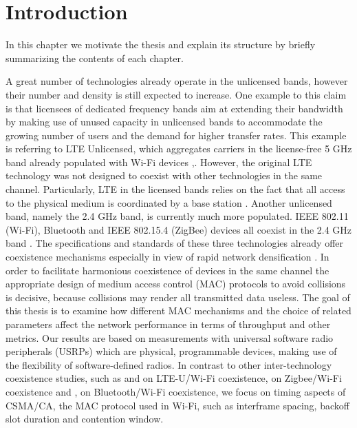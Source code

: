 \chapter{Introduction}
\label{ch:introduction}

In this chapter we motivate the thesis and explain its structure by briefly summarizing the contents of each chapter.

A great number of technologies already operate in the unlicensed bands, however their number and density is still expected to increase. One example to this claim is that licensees of dedicated frequency bands aim at extending their bandwidth by making use of unused capacity in unlicensed bands to accommodate the growing number of users and the demand for higher transfer rates. This example is referring to LTE Unlicensed, which aggregates carriers in the license-free 5 GHz band already populated with Wi-Fi devices \cite{nihtilä13},\cite{qualcomm15}. However, the original LTE technology was not designed to coexist with other technologies in the same channel. Particularly, LTE in the licensed bands relies on the fact that all access to the physical medium is coordinated by a base station \cite{ghosh10}. Another unlicensed band, namely the 2.4 GHz band, is currently much more populated. IEEE 802.11 (Wi-Fi), Bluetooth and IEEE 802.15.4 (ZigBee) devices all coexist in the 2.4 GHz band \cite{lee07}. The specifications and standards of these three technologies already offer coexistence mechanisms especially in view of rapid network densification \cite{bhushan14}. In order to facilitate harmonious coexistence of devices in the same channel the appropriate design of medium access control (MAC) protocols to avoid collisions is decisive, because collisions may render all transmitted data useless. The goal of this thesis is to examine how different MAC mechanisms and the choice of related parameters affect the network performance in terms of throughput and other metrics. Our results are based on measurements with universal software radio peripherals (USRPs) which are physical, programmable devices, making use of the flexibility of software-defined radios. In contrast to other inter-technology coexistence studies, such as \cite{gomezmiguelez16} and \cite{capretti16} on LTE-U/Wi-Fi coexistence, \cite{zhang11} on Zigbee/Wi-Fi coexistence and \cite{corvaja06},\cite{chiasserini02} on Bluetooth/Wi-Fi coexistence, we focus on timing aspects of CSMA/CA, the MAC protocol used in Wi-Fi, such as interframe spacing, backoff slot duration and contention window.

